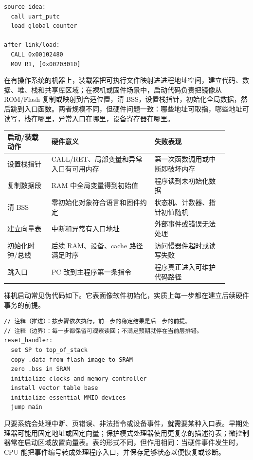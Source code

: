 \begin{lstlisting}
source idea:
  call uart_putc
  load global_counter

after link/load:
  CALL 0x00102480
  MOV R1, [0x00203010]
\end{lstlisting}

在有操作系统的机器上，装载器把可执行文件映射进进程地址空间，建立代码、数据、堆、栈和共享库区域；在裸机或固件场景中，启动代码负责把镜像从 ROM/Flash 复制或映射到合适位置，清 BSS，设置栈指针，初始化全局数据，然后跳到入口函数。两者规模不同，但硬件问题一致：哪些地址可取指，哪些地址可读写，栈在哪里，异常入口在哪里，设备寄存器在哪里。

\begin{longtable}{L{0.18\linewidth}L{0.42\linewidth}L{0.3\linewidth}}
\toprule
启动/装载动作 & 硬件意义 & 失败表现 \\
\midrule
设置栈指针 & CALL/RET、局部变量和异常入口有可用内存 & 第一次函数调用或中断即破坏内存 \\\tablerowrule
复制数据段 & RAM 中全局变量得到初始值 & 程序读到未初始化数据 \\\tablerowrule
清 BSS & 零初始化对象符合语言和固件约定 & 状态机、计数器、指针初值随机 \\\tablerowrule
建立向量表 & 中断和异常有入口地址 & 外部事件或错误无法处理 \\\tablerowrule
初始化时钟/总线 & 后续 RAM、设备、cache 路径满足时序 & 访问慢器件超时或读写失败 \\\tablerowrule
跳入口 & PC 改到主程序第一条指令 & 程序真正进入可维护代码路径 \\
\bottomrule
\end{longtable}

裸机启动常见伪代码如下。它表面像软件初始化，实质上每一步都在建立后续硬件事务的前提。

\begin{lstlisting}
// 注释（推进）：按步骤依次执行，前一步的稳定结果是后一步的前提。
// 注释（边界）：每一步都保留可观察读回；不满足预期就停在当前层排错。
reset_handler:
  set SP to top_of_stack
  copy .data from flash image to SRAM
  zero .bss in SRAM
  initialize clocks and memory controller
  install vector table base
  initialize essential MMIO devices
  jump main
\end{lstlisting}

只要系统会处理中断、页错误、非法指令或设备事件，就需要某种入口表。早期处理器可能用固定地址或固定向量；保护模式处理器使用更复杂的描述符表；微控制器常在启动区域放置向量表。表的形式不同，但作用相同：当硬件事件发生时，CPU 能把事件编号转成处理程序入口，并保存足够状态以便恢复或诊断。


